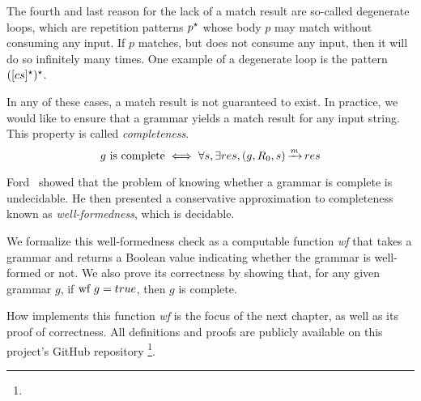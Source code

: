 The fourth and last reason
for the lack of a match result
are so-called degenerate loops,
which are repetition patterns ${p^\star}$
whose body $p$
may match without consuming any input.
If $p$ matches, but does not consume any input,
then it will do so infinitely many times.
One example of a degenerate loop is the pattern
${([cs]^\star)^\star}$.

In any of these cases,
a match result is not guaranteed to exist.
In practice,
we would like to ensure that
a grammar yields a match result
for any input string.
This property is called \emph{completeness}.
\begin{equation}
    \text{$g$ is complete} \iff
    \forall s, \exists res, \Matches{g}{\PNT{0}}{s}{res}
\end{equation}

Ford~\cite{ford_parsing_2004} showed that
the problem of knowing whether a grammar
is complete is undecidable.
He then presented a conservative approximation
to completeness known as \emph{well-formedness},
which is decidable.

We formalize this well-formedness check
as a computable function \textit{wf}
that takes a grammar and returns a Boolean value
indicating whether the grammar is well-formed or not.
We also prove its correctness by showing that,
for any given grammar $g$,
if $\text{wf}\ g = true$,
then $g$ is complete.

How \lpeg{} implements this function \textit{wf}
is the focus of the next chapter,
as well as its proof of correctness.
All definitions and proofs
are publicly available on this project's GitHub repository%
\footnote{}.